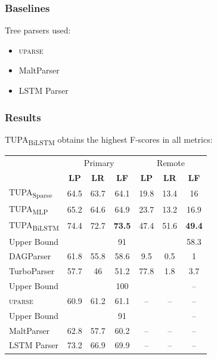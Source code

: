 \documentclass[t]{beamer}
\newcommand{\parser}[1]{TUPA\textsubscript{#1}}
\begin{document}
\begin{frame}
\frametitle{Baselines}
Tree parsers used:
\begin{itemize}
 \item \textsc{uparse} \cite{maier-lichte:2016:DiscoNLP}
 \item MaltParser \cite{nivre2007maltparser}
 \item LSTM Parser \cite{dyer2015transition}
\end{itemize}
\end{frame}

\begin{frame}
\frametitle{Results}
\parser{BiLSTM} obtains the highest F-scores in all metrics:
\begin{center}
	\begin{tabular}{l|ccc|ccc}
		& \multicolumn{3}{c|}{Primary} & \multicolumn{3}{c}{Remote} \\
		& \textbf{LP} & \textbf{LR} & \textbf{LF} & \textbf{LP} & \textbf{LR} & \textbf{LF} \\
		\hline
		\parser{Sparse}
		& 64.5 & 63.7 & 64.1 & 19.8 & 13.4 & 16 \\
		\parser{MLP}
		& 65.2 & 64.6 & 64.9 & 23.7 & 13.2 & 16.9 \\
		\parser{BiLSTM}
		& 74.4 & 72.7 & \textbf{73.5} & 47.4 & 51.6 & \textbf{49.4} \\
		\hline
		\footnotesize Upper Bound
		& & & \small 91 & & & \small 58.3 \\
		DAGParser
		& 61.8 & 55.8 & 58.6 & 9.5 & 0.5 & 1 \\
		TurboParser
		& 57.7 & 46 & 51.2 & 77.8 & 1.8 & 3.7 \\
		\hline
		\footnotesize Upper Bound
		& & & \small 100 & & & \small -- \\
		\textsc{uparse}
		& 60.9 & 61.2 & 61.1 & -- & -- & -- \\
		\hline
		\footnotesize Upper Bound
		& & & \footnotesize 91 & & & \footnotesize -- \\
		MaltParser
		& 62.8 & 57.7 & 60.2 & -- & -- & -- \\
		LSTM Parser
		& 73.2 & 66.9 & 69.9 & -- & -- & --
	\end{tabular}
\end{center}
\end{frame}
\end{document}
